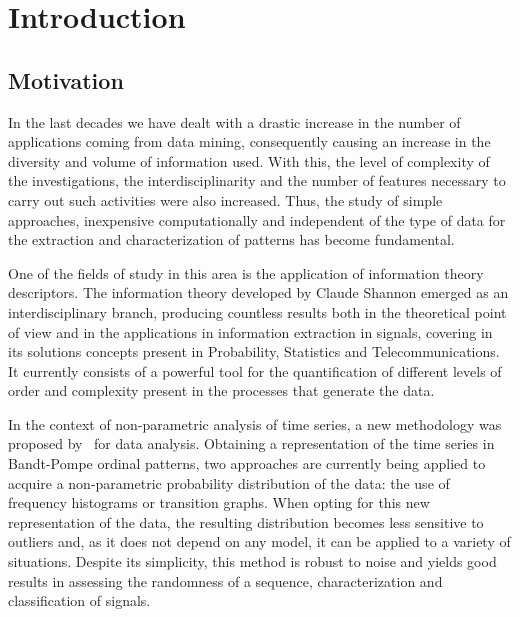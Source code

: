 \chapter{Introduction} \label{intro}

\section{Motivation}


In the last decades we have dealt with a drastic increase in the number of applications coming from data mining, consequently causing an increase in the diversity and volume of information used.
With this, the level of complexity of the investigations, the interdisciplinarity and the number of features necessary to carry out such activities were also increased.
Thus, the study of simple approaches, inexpensive computationally and independent of the type of data for the extraction and characterization of patterns has become fundamental.

One of the fields of study in this area is the application of information theory descriptors.
The information theory developed by Claude Shannon emerged as an interdisciplinary branch, producing countless results both in the theoretical point of view and in the applications in information extraction in signals, covering in its solutions concepts present in Probability, Statistics and Telecommunications.
It currently consists of a powerful tool for the quantification of different levels of order and complexity present in the processes that generate the data.

In the context of non-parametric analysis of time series, a new methodology was proposed by~\cite{PermutationEntropyBandtPompe} for data analysis.
Obtaining a representation of the time series in Bandt-Pompe ordinal patterns, two approaches are currently being applied to acquire a non-parametric probability distribution of the data: the use of frequency histograms or transition graphs.
When opting for this new representation of the data, the resulting distribution becomes less sensitive to outliers and, as it does not depend on any model, it can be applied to a variety of situations.
Despite its simplicity, this method is robust to noise and yields good results in assessing the randomness of a sequence, characterization and classification of signals.



